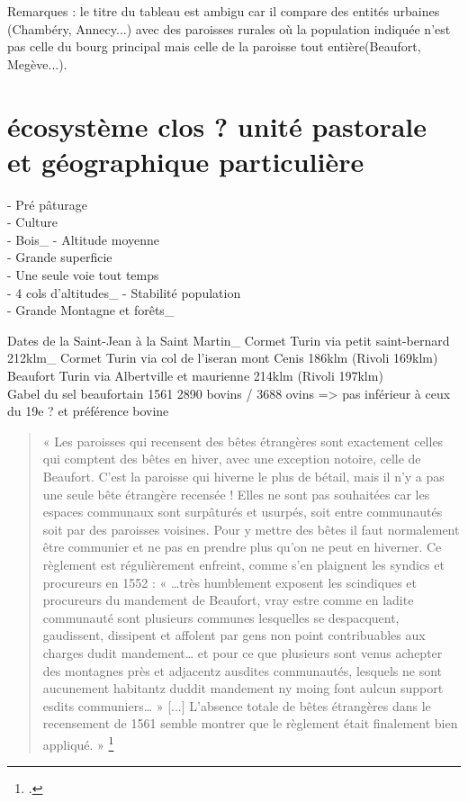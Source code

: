 \documentclass[12pt,a4paper]{report}
\begin{document}
Remarques : le titre du tableau est ambigu car il compare des entités urbaines (Chambéry, Annecy...) avec des paroisses rurales où la population indiquée n'est pas celle du bourg principal mais celle de la paroisse tout entière(Beaufort, Megève...).



\section{écosystème clos ? unité pastorale et géographique particulière}
	-	Pré pâturage\\
	-	Culture\\
	-	Bois\_
	-	Altitude moyenne\\
	-	Grande superficie\\
	-	Une seule voie tout temps\\
	-	4 cols d’altitudes\_
	-	Stabilité population\\
	-	Grande Montagne et forêts\_
	
	Dates de la Saint-Jean à la Saint Martin\_
	Cormet Turin via petit saint-bernard 212klm\_
	Cormet Turin via col de l’iseran mont Cenis 186klm (Rivoli 169klm)\\
	Beaufort Turin via Albertville et maurienne 214klm (Rivoli 197klm)\\
	
	Gabel du sel beaufortain 1561 2890 bovins / 3688 ovins => pas inférieur à ceux du 19e ? et préférence bovine
	
		\begin{quote}
		« Les paroisses qui recensent des bêtes étrangères sont exactement celles qui comptent des bêtes en hiver, avec une exception notoire, celle de Beaufort. C’est la paroisse qui hiverne le plus de bétail, mais il n’y a pas une seule bête étrangère recensée ! Elles ne sont pas souhaitées car les espaces communaux sont surpâturés et usurpés, soit entre communautés soit par des paroisses voisines. Pour y mettre des bêtes il faut normalement être communier et ne pas en prendre plus qu’on ne peut en hiverner. Ce règlement est régulièrement enfreint, comme s’en plaignent les syndics et procureurs en 1552 : « …très humblement exposent les scindiques et procureurs du mandement de Beaufort, vray estre comme en ladite communauté sont plusieurs communes lesquelles se despacquent, gaudissent, dissipent et affolent par gens non point contribuables aux charges dudit mandement… et pour ce que plusieurs sont venus achepter des montagnes près et adjacentz ausdites communautés, lesquels ne sont aucunement habitantz duddit mandement ny moing font aulcun support esdits communiers… » [...] L’absence totale de bêtes étrangères dans le recensement de 1561 semble montrer que le règlement était finalement bien appliqué. »
		\footcite[88]{Gachet2011GabelleSel1561}
	\end{quote}
	
\end{document}
